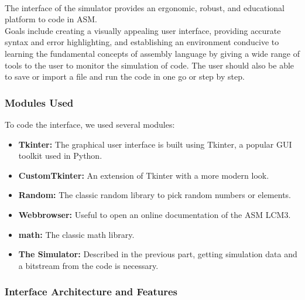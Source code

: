 \documentclass{article}
\begin{document}
\paragraph{}

The interface of the simulator provides an ergonomic, robust, and educational platform to code in ASM.\\
Goals include creating a visually appealing user interface, providing accurate syntax and error highlighting, and establishing an environment conducive to learning the fundamental concepts of assembly language by giving a wide range of tools to the user to monitor the simulation of code. The user should also be able to save or import a file and run the code in one go or step by step.

\paragraph{}
\subsubsection{Modules Used}

To code the interface, we used several modules:

\begin{itemize}
    \item \textbf{Tkinter:} The graphical user interface is built using Tkinter, a popular GUI toolkit used in Python.
    \item \textbf{CustomTkinter:} An extension of Tkinter with a more modern look.
    \item \textbf{Random:} The classic random library to pick random numbers or elements.
    \item \textbf{Webbrowser:} Useful to open an online documentation of the ASM LCM3.
    \item \textbf{math:} The classic math library.
    \item \textbf{The Simulator:} Described in the previous part, getting simulation data and a bitstream from the code is necessary. 
\end{itemize}

\paragraph{}
\subsubsection{Interface Architecture and Features}
\end{document}
